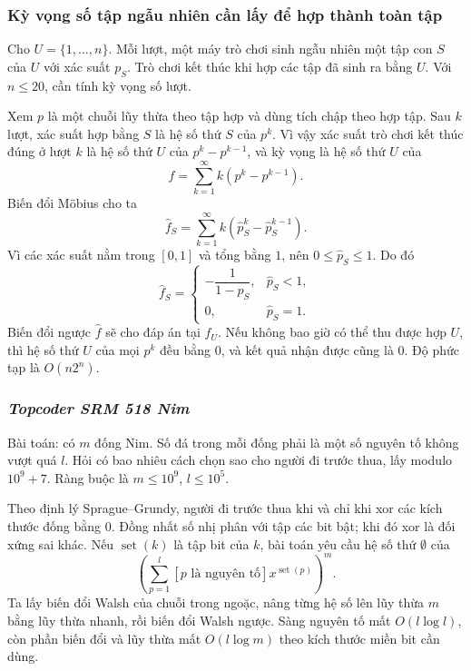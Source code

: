 \documentclass[11pt]{article}
\begin{document}
\subsubsection{Kỳ vọng số tập ngẫu nhiên cần lấy để hợp thành toàn tập}

Cho \(U=\{1,\ldots,n\}\). Mỗi lượt, một máy trò chơi sinh ngẫu nhiên một tập
con \(S\) của \(U\) với xác suất \(p_S\). Trò chơi kết thúc khi hợp các tập đã
sinh ra bằng \(U\). Với \(n\le 20\), cần tính kỳ vọng số lượt.

Xem \(p\) là một chuỗi lũy thừa theo tập hợp và dùng tích chập theo hợp tập.
Sau \(k\) lượt, xác suất hợp bằng \(S\) là hệ số thứ \(S\) của \(p^k\). Vì vậy
xác suất trò chơi kết thúc đúng ở lượt \(k\) là hệ số thứ \(U\) của
\(p^k-p^{k-1}\), và kỳ vọng là hệ số thứ \(U\) của
\[
  f=\sum_{k=1}^{\infty} k(p^k-p^{k-1}).
\]
Biến đổi Möbius cho ta
\[
  \hat f_S=\sum_{k=1}^{\infty} k(\hat p_S^k-\hat p_S^{k-1}).
\]
Vì các xác suất nằm trong \([0,1]\) và tổng bằng \(1\), nên \(0\le \hat p_S\le
1\). Do đó
\[
  \hat f_S=
  \begin{cases}
    -\dfrac{1}{1-\hat p_S}, & \hat p_S<1,\\
    0, & \hat p_S=1.
  \end{cases}
\]
Biến đổi ngược \(\hat f\) sẽ cho đáp án tại \(f_U\). Nếu không bao giờ có thể
thu được hợp \(U\), thì hệ số thứ \(U\) của mọi \(p^k\) đều bằng \(0\), và kết
quả nhận được cũng là \(0\). Độ phức tạp là \(O(n2^n)\).

\subsubsection{\emph{Topcoder SRM 518 Nim}}

Bài toán: có \(m\) đống Nim. Số đá trong mỗi đống phải là một số nguyên tố
không vượt quá \(l\). Hỏi có bao nhiêu cách chọn sao cho người đi trước thua,
lấy modulo \(10^9+7\). Ràng buộc là \(m\le 10^9\), \(l\le 10^5\).

Theo định lý Sprague--Grundy, người đi trước thua khi và chỉ khi xor các kích
thước đống bằng \(0\). Đồng nhất số nhị phân với tập các bit bật; khi đó xor
là đối xứng sai khác. Nếu \(\operatorname{set}(k)\) là tập bit của \(k\), bài
toán yêu cầu hệ số thứ \(\emptyset\) của
\[
  \left(\sum_{p=1}^{l} [p\text{ là nguyên tố}]x^{\operatorname{set}(p)}\right)^m.
  \tag{32}
\]
Ta lấy biến đổi Walsh của chuỗi trong ngoặc, nâng từng hệ số lên lũy thừa \(m\)
bằng lũy thừa nhanh, rồi biến đổi Walsh ngược. Sàng nguyên tố mất
\(O(l\log l)\), còn phần biến đổi và lũy thừa mất \(O(l\log m)\) theo kích
thước miền bit cần dùng.
\end{document}
